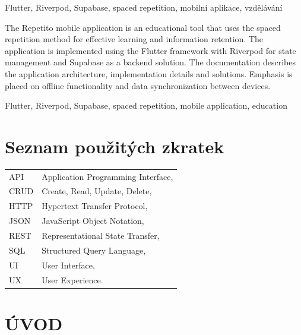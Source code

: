 \documentclass[12pt, a4paper, twoside, openright]{report}
\begin{document}
	\vspace{18pt}

	\noindent Flutter, Riverpod, Supabase, spaced repetition, mobilní aplikace, vzdělávání

	\vspace{18pt}
	The Repetito mobile application is an educational tool that uses the spaced repetition method for effective learning and information retention. The application is implemented using the Flutter framework with Riverpod for state management and Supabase as a backend solution. The documentation describes the application architecture, implementation details and solutions. Emphasis is placed on offline functionality and data synchronization between devices.

	\vspace{18pt}

	\noindent Flutter, Riverpod, Supabase, spaced repetition, mobile application, education

	\chapter*{Seznam použitých zkratek}
	\begin{tabular}{ll}
		API & Application Programming Interface,\\
		CRUD & Create, Read, Update, Delete,\\
		HTTP & Hypertext Transfer Protocol,\\
		JSON & JavaScript Object Notation,\\
		REST & Representational State Transfer,\\
		SQL & Structured Query Language,\\
		UI & User Interface,\\
		UX & User Experience.\\
	\end{tabular}

\newcommand{\introsubheading}[1]{%
  {\noindent\textbf{\normalsize #1}\vspace{1pt}\par}%
}

\chapter*{ÚVOD}
\end{document}
